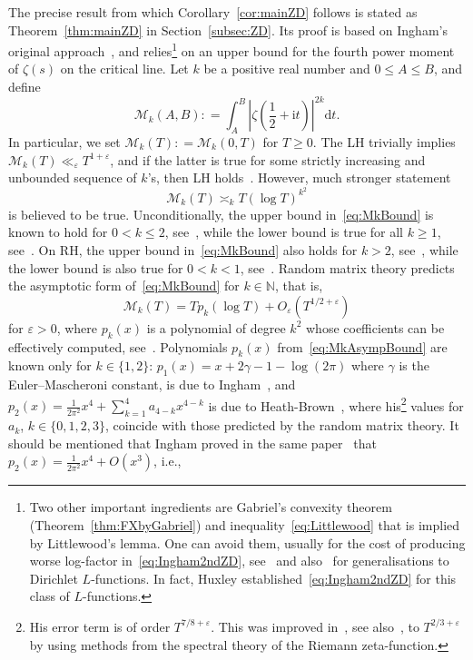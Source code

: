 \documentclass[a4paper,reqno]{amsart}
\theoremstyle{definition}
\newcommand{\NN}{\mathbb{N}}
\newcommand{\de}[0]{\mathrel{\mathop:}=}
\newcommand{\ie}[0]{\mathrm{i}}
\newcommand{\dif}[1]{\mathrm{d}#1}
\begin{document}
The precise result from which Corollary~\ref{cor:mainZD} follows is stated as Theorem~\ref{thm:mainZD} in Section~\ref{subsec:ZD}. Its proof is based on Ingham's original approach~\cite{In40}, and relies\footnote{Two other important ingredients are Gabriel's convexity theorem (Theorem~\ref{thm:FXbyGabriel}) and inequality~\eqref{eq:Littlewood} that is implied by Littlewood's lemma. One can avoid them, usually for the cost of producing worse log-factor in~\eqref{eq:Ingham2ndZD}, see~\cite[Chapter~11]{Ivic} and also~\cite[Chapter~12]{MontgomeryTopics} for generalisations to Dirichlet $L$-functions. In fact, Huxley established~\eqref{eq:Ingham2ndZD} for this class of $L$-functions.} on an upper bound for the fourth power moment of $\zeta(s)$ on the critical line. Let $k$ be a positive real number and $0\leq A\leq B$, and define
\begin{equation}
\label{eq:Mk}
\mathcal{M}_{k}(A,B) \de \int_{A}^{B}\left|\zeta\left(\frac{1}{2}+\ie t\right)\right|^{2k}\dif{t}.
\end{equation}
In particular, we set $\mathcal{M}_{k}(T)\de \mathcal{M}_{k}(0,T)$ for $T\geq 0$. The LH trivially implies $\mathcal{M}_{k}(T)\ll_{\varepsilon} T^{1+\varepsilon}$, and if the latter is true for some strictly increasing and unbounded sequence of $k$'s, then LH holds~\cite[Theorem~13.2]{titchmarsh1986theory}. However, much stronger statement
\begin{equation}
\label{eq:MkBound}
\mathcal{M}_{k}(T) \asymp_{k} T\left(\log{T}\right)^{k^2}
\end{equation}
is believed to be true. Unconditionally, the upper bound in~\eqref{eq:MkBound} is known to hold for $0<k\leq 2$, see~\cite{HeapRadziwillSound}, while the lower bound is true for all $k\geq 1$, see~\cite{RadziwillSoundLower}. On RH, the upper bound in~\eqref{eq:MkBound} also holds for $k>2$, see~\cite{Harper2013}, while the lower bound is also true for $0<k<1$, see~\cite{HBFractionalMoments}. Random matrix theory predicts the asymptotic form of~\eqref{eq:MkBound} for $k\in\NN$, that is,
\begin{equation}
\label{eq:MkAsympBound}
\mathcal{M}_{k}(T) = Tp_{k}(\log{T}) + O_{\varepsilon}\left(T^{1/2+\varepsilon}\right)
\end{equation}
for $\varepsilon>0$, where $p_{k}(x)$ is a polynomial of degree $k^2$ whose coefficients can be effectively computed, see~\cite{ConreyMoments}.
Polynomials $p_{k}(x)$ from~\eqref{eq:MkAsympBound} are known only for $k\in\{1,2\}$: $p_1(x)=x+2\gamma-1-\log{(2\pi)}$ where $\gamma$ is the Euler--Mascheroni constant, is due to Ingham~\cite{Ingham1926MV}, and $p_2(x)=\frac{1}{2\pi^2}x^4+\sum_{k=1}^{4}a_{4-k}x^{4-k}$ is due to Heath-Brown~\cite{HeathBrown1979TheFP}, where his\footnote{His error term is of order $T^{7/8+\varepsilon}$. This was improved in~\cite{IvicMotohashi95}, see also~\cite{PalTrud}, to $T^{2/3+\varepsilon}$ by using methods from the spectral theory of the Riemann zeta-function.} values for $a_k$, $k\in\{0,1,2,3\}$, coincide with those predicted by the random matrix theory. It should be mentioned that Ingham proved in the same paper~\cite{Ingham1926MV} that $p_2(x)=\frac{1}{2\pi^2}x^4+O(x^3)$, i.e.,
\end{document}
